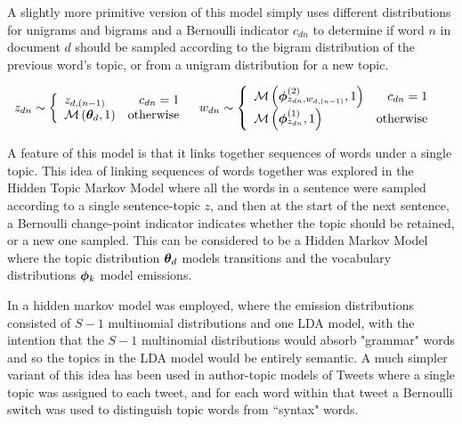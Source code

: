 A slightly more primitive version of this model\cite{Wang2007} simply uses different distributions for unigrams and bigrams and a Bernoulli indicator $c_{dn}$ to determine if word $n$ in document $d$ should be sampled according to the bigram distribution of the previous word's topic, or from a unigram distribution for a new topic.

\begin{align}
z_{dn} & \sim \left\{
    \begin{array}{lr}
        z_{d,(n-1)} & c_{dn} = 1 \\
        \mathcal{M} \left( {{ \bm \theta_d }},{1} \right) & \text{otherwise}
    \end{array}
\right.
& 
w_{dn} & \sim \left\{
    \begin{array}{lr}
        \mathcal{M} \left( {\bm \phi_{z_{dn},w_{d,(n-1)}}^{(2)}},{1} \right) & c_{dn} = 1 \\
        \mathcal{M} \left( {\bm \phi_{z_{dn}}^{(1)}},{1} \right) & \text{otherwise}
    \end{array}
\right.
\end{align}

A feature of this model is that it links together sequences of words under a single topic. This idea of linking sequences of words together was explored in the Hidden Topic Markov Model\cite{Gruber2007} where all the words in a sentence were sampled according to a single sentence-topic $z$, and then at the start of the next sentence, a Bernoulli change-point indicator indicates whether the topic should be retained, or a new one sampled. This can be considered to be a Hidden Markov Model where the topic distribution ${ \bm \theta_d }$ models transitions and the vocabulary distributions $\bm \phi_k$ model emissions. 

In \cite{Griffiths2005} a hidden markov model was employed, where the emission distributions consisted of $S-1$ multinomial distributions and one LDA model, with the intention that the $S-1$ multinomial distributions would absorb "grammar" words and so the topics in the LDA model would be entirely semantic. A much simpler variant of this idea has been used in author-topic models of Tweets\cite{Zhao2011}\cite{Zhao2011a} where a single topic was assigned to each tweet, and for each word within that tweet a Bernoulli switch was used to distinguish topic words from ``syntax" words.

